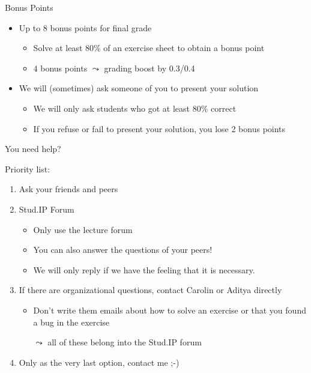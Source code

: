 \documentclass[aspectratio=169]{../latex_main/tntbeamer}  %
\begin{document}
\begin{frame}[c]{Bonus Points}

\begin{itemize}

  \item Up to \alert{$8$ bonus points} for final grade
  \begin{itemize}
      \item Solve at least $80\%$ of an exercise sheet to obtain a bonus point
      \item $4$ bonus points $\leadsto$ grading boost by 0.3/0.4
  \end{itemize}
  \item We will (sometimes) ask someone of you to present your solution 
  \begin{itemize}
      \item We will only ask students who got at least 80\% correct
      \item If you refuse or fail to present your solution, you lose 2 bonus points
  \end{itemize}
\end{itemize}

\end{frame}
\begin{frame}[c]{You need help?}
	
Priority list:
	\begin{enumerate}
		\item Ask your friends and peers
		\item Stud.IP Forum
		\begin{itemize}
		    \item Only use the lecture forum
			\item You can also answer the questions of your peers! 
			\item We will only reply if we have the feeling that it is necessary.
		\end{itemize}
		\item If there are organizational questions, contact Carolin or Aditya directly 
		\begin{itemize}
		    \item Don't write them emails about how to solve an exercise or that you found a bug in the exercise
		    \item[$\leadsto$] all of these belong into the Stud.IP forum
		\end{itemize}
		\item Only as the very last option, contact me ;-)
	\end{enumerate}
	
\end{frame}
\end{document}
